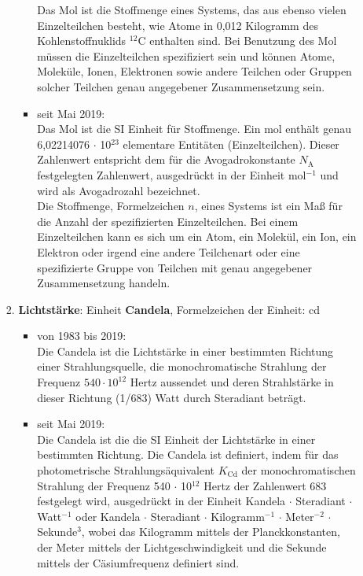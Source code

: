 \begin{raggedright}
\begin{enumerate}
\begin{itemize}
\begin{enumerate}[1.)]
\begin{itemize}
			Das Mol ist die Stoffmenge eines Systems, das aus ebenso vielen
			Einzelteilchen besteht, wie Atome in 0,012 Kilogramm des
			Kohlenstoffnuklids $^{12}\mathrm{C}$ enthalten sind. Bei Benutzung des Mol
			müssen die Einzelteilchen spezifiziert sein und können Atome, Moleküle,
			Ionen, Elektronen sowie andere Teilchen oder Gruppen solcher
			Teilchen genau angegebener Zusammensetzung sein.
			\item seit Mai 2019:\\
      Das Mol ist die SI Einheit für Stoffmenge. Ein mol
      enthält genau 6,02214076 $\cdot$ 10$^{23}$ elementare Entitäten (Einzelteilchen).
      Dieser Zahlenwert entspricht dem für die Avogadrokonstante
      $N_\mathrm{A}$ festgelegten Zahlenwert, ausgedrückt in der Einheit mol$^{-1}$
      und wird als Avogadrozahl bezeichnet.\\
      Die Stoffmenge, Formelzeichen $n$, eines Systems ist ein Maß für die Anzahl der
      spezifizierten Einzelteilchen. Bei einem Einzelteilchen kann es sich um ein Atom, ein Molekül,
      ein Ion, ein Elektron oder irgend eine andere Teilchenart oder eine spezifizierte Gruppe
      von Teilchen mit genau angegebener Zusammensetzung handeln.\\
			\end{itemize}
		\item \textbf{Lichtstärke}: Einheit \textbf{Candela}, Formelzeichen der Einheit: cd
			\begin{itemize}
			\item von 1983 bis 2019:\\
			Die Candela ist die Lichtstärke in einer bestimmten Richtung
			einer Strahlungsquelle, die monochromatische Strahlung der
			Frequenz $540 \cdot 10^{12}$ Hertz aussendet und deren Strahlstärke in
			dieser Richtung (1/683) Watt durch Steradiant beträgt.
			\item seit Mai 2019:\\
      Die Candela ist die die SI Einheit der Lichtstärke in einer bestimmten Richtung.
      Die Candela ist definiert, indem für das photometrische Strahlungsäquivalent
      $K_\mathrm{Cd}$ der monochromatischen Strahlung der
      Frequenz 540 $\cdot$ 10$^{12}$ Hertz der Zahlenwert 683 festgelegt wird,
      ausgedrückt in der Einheit Kandela $\cdot$ Steradiant $\cdot$ Watt$^{-1}$
      oder Kandela $\cdot$ Steradiant $\cdot$ Kilogramm$^{-1}$ $\cdot$ Meter$^{-2}$ $\cdot$ Sekunde$^3$,
      wobei das Kilogramm mittels der Planckkonstanten, der Meter mittels
      der Lichtgeschwindigkeit und die Sekunde mittels der Cäsiumfrequenz definiert sind.
			\end{itemize}
		\end{enumerate}
	\begin{verbatim}


\end{verbatim}
\end{itemize}
\end{enumerate}
\end{raggedright}

